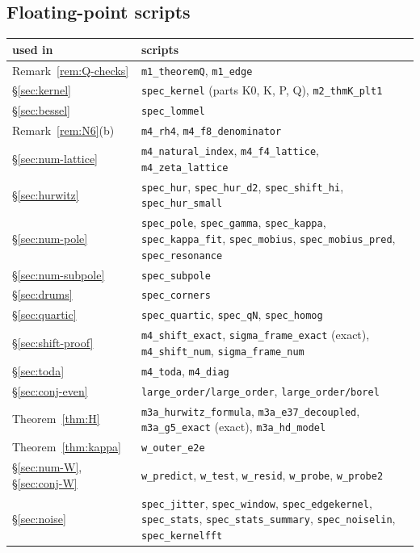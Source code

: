 \subsection*{Floating-point scripts}
\begin{center}
\small
\begin{tabular}{lp{10cm}}
\toprule
used in & scripts\\
\midrule
Remark~\ref{rem:Q-checks} & \texttt{m1\_theoremQ}, \texttt{m1\_edge}\\
\S\ref{sec:kernel} & \texttt{spec\_kernel} (parts K0, K, P, Q), \texttt{m2\_thmK\_plt1}\\
\S\ref{sec:bessel} & \texttt{spec\_lommel}\\
Remark~\ref{rem:N6}(b) & \texttt{m4\_rh4}, \texttt{m4\_f8\_denominator}\\
\S\ref{sec:num-lattice} & \texttt{m4\_natural\_index}, \texttt{m4\_f4\_lattice}, \texttt{m4\_zeta\_lattice}\\
\S\ref{sec:hurwitz} & \texttt{spec\_hur}, \texttt{spec\_hur\_d2}, \texttt{spec\_shift\_hi}, \texttt{spec\_hur\_small}\\
\S\ref{sec:num-pole} & \texttt{spec\_pole}, \texttt{spec\_gamma}, \texttt{spec\_kappa}, \texttt{spec\_kappa\_fit},
  \texttt{spec\_mobius}, \texttt{spec\_mobius\_pred}, \texttt{spec\_resonance}\\
\S\ref{sec:num-subpole} & \texttt{spec\_subpole}\\
\S\ref{sec:drums} & \texttt{spec\_corners}\\
\S\ref{sec:quartic} & \texttt{spec\_quartic}, \texttt{spec\_qN}, \texttt{spec\_homog}\\
\S\ref{sec:shift-proof} & \texttt{m4\_shift\_exact}, \texttt{sigma\_frame\_exact} (exact), \texttt{m4\_shift\_num},
  \texttt{sigma\_frame\_num}\\
\S\ref{sec:toda} & \texttt{m4\_toda}, \texttt{m4\_diag}\\
\S\ref{sec:conj-even} & \texttt{large\_order/large\_order}, \texttt{large\_order/borel}\\
Theorem~\ref{thm:H} & \texttt{m3a\_hurwitz\_formula}, \texttt{m3a\_e37\_decoupled}, \texttt{m3a\_g5\_exact} (exact),
  \texttt{m3a\_hd\_model}\\
Theorem~\ref{thm:kappa} & \texttt{w\_outer\_e2e}\\
\S\ref{sec:num-W}, \S\ref{sec:conj-W} & \texttt{w\_predict}, \texttt{w\_test}, \texttt{w\_resid}, \texttt{w\_probe}, \texttt{w\_probe2}\\
\S\ref{sec:noise} & \texttt{spec\_jitter}, \texttt{spec\_window}, \texttt{spec\_edgekernel}, \texttt{spec\_stats},
  \texttt{spec\_stats\_summary}, \texttt{spec\_noiselin}, \texttt{spec\_kernelfft}\\
\bottomrule
\end{tabular}
\end{center}

